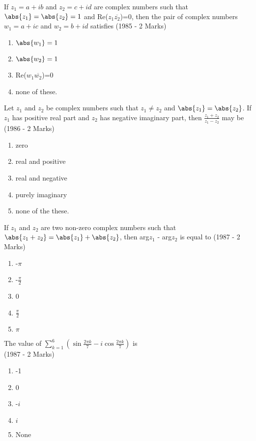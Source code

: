 \iffalse
\title{Assignment-1}
\author{AI24BTECH11036- Shreedhanvi Yadlapally}
\section{mcq-multiple}
\fi
	\item If $z_{1}=a+ib$ and $z_{2}=c+id$ are complex numbers such that $\abs{z_{1}}=\abs{z_{2}}=1$ and Re($z_{1}\overline{z_{2}}$)=0, then the pair of complex numbers $w_{1}=a+ic$ and $w_{2}=b+id$ satisfies \hfill{(1985 - 2 Marks)}
		\begin{multicols}{2}
 \begin{enumerate}
	\item $\abs{w_{1}}=1$
	\item $\abs{w_{2}}=1$
	\item Re($w_{1}\overline{w_{2}}$)=0
	\item none of these.
\end{enumerate}
		\end{multicols}

\item Let $z_{1}$ and $z_{2}$ be complex numbers such that $z_{1}\neq z_{2}$ and $\abs{z_{1}}=\abs{z_{2}}$. If $z_{1}$ has positive real part and $z_{2}$ has negative imaginary part, then $\frac{z_{1}+z_{2}}{z_{1}-z_{2}}$ may be \hfill{(1986 - 2 Marks)}
	\begin{multicols}{2}
\begin{enumerate}
	\item zero
	\item real and positive
	\item real and negative
	\item purely imaginary
	\item none of the these.
\end{enumerate}
	\end{multicols}

\item If $z_{1}$ and $z_{2}$ are two non-zero complex numbers such that $\abs{z_{1}+z_{2}}=\abs{z_{1}}+\abs{z_{2}}$, then arg$z_{1}$ - arg$z_{2}$ is equal to \hfill{(1987 - 2 Marks)}
	\begin{multicols}{4}
\begin{enumerate}
	\item -$\pi$
	\item -$\frac{\pi}{2}$
        \item 0
        \item $\frac{\pi}{2}$
	\item $\pi$
\end{enumerate}
	\end{multicols}

\item The value of $\sum_{k=1} ^{6} (\sin \frac{2\pi k}{7}-i\cos \frac{2\pi k}{7})$ is                        \\

	\hfill{(1987 - 2 Marks)}
		\begin{multicols}{4}
\begin{enumerate}
	
	\item -1
	\item 0
	\item -$i$
	\item $i$
	\item None
\end{enumerate}
		\end{multicols}
